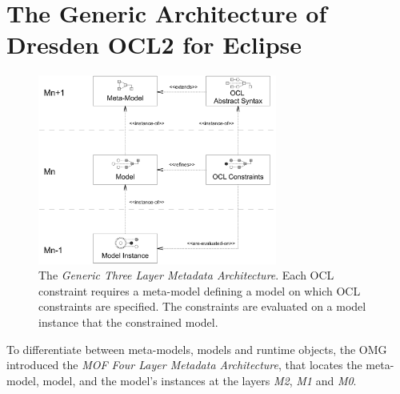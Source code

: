 \section{The Generic Architecture of Dresden OCL2 for Eclipse}
\begin{figure}[tb]
	\centering
		\includegraphics[width=0.70\textwidth]{figures/genericlayers.pdf}
	\caption{The \textit{Generic Three Layer Metadata Architecture}. Each OCL constraint 
	requires a meta-model defining a model on which OCL constraints are specified. The 
	constraints are evaluated on a model instance that
	 the constrained model. }
	\label{fig:genericlayers}
\end{figure}

To differentiate between meta-models, models and runtime objects, the OMG introduced 
the \textit{MOF Four Layer Metadata Architecture}, that locates the meta-model, 
model, and the model's instances at the layers \textit{M2}, \textit{M1} and \textit{M0}. 

